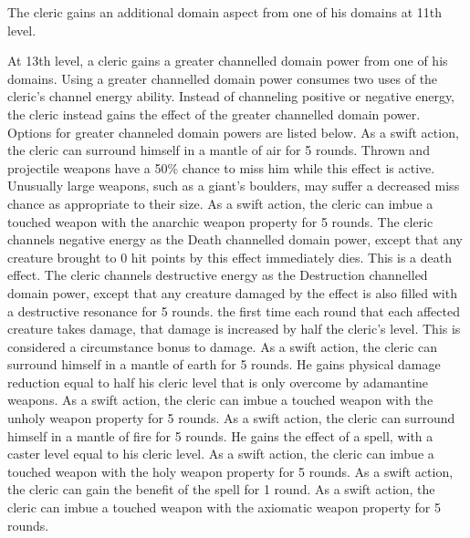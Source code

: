 \par The cleric gains an additional domain aspect from one of his domains at 11th level.

 At 13th level, a cleric gains a greater channelled domain power from one of his domains. Using a greater channelled domain power consumes two uses of the cleric's channel energy ability. Instead of channeling positive or negative energy, the cleric instead gains the effect of the greater channelled domain power. Options for greater channeled domain powers are listed below.
 As a swift action, the cleric can surround himself in a mantle of air for 5 rounds. Thrown and projectile weapons have a 50\% chance to miss him while this effect is active. Unusually large weapons, such as a giant's boulders, may suffer a decreased miss chance as appropriate to their size.
 As a swift action, the cleric can imbue a touched weapon with the anarchic weapon property for 5 rounds.
 The cleric channels negative energy as the Death channelled domain power, except that any creature brought to 0 hit points by this effect immediately dies. This is a death effect.
 The cleric channels destructive energy as the Destruction channelled domain power, except that any creature damaged by the effect is also filled with a destructive resonance for 5 rounds. the first time each round that each affected creature takes damage, that damage is increased by half the cleric's level. This is considered a circumstance bonus to damage.
 As a swift action, the cleric can surround himself in a mantle of earth for 5 rounds. He gains physical damage reduction equal to half his cleric level that is only overcome by adamantine weapons.
 As a swift action, the cleric can imbue a touched weapon with the unholy weapon property for 5 rounds.
 As a swift action, the cleric can surround himself in a mantle of fire for 5 rounds. He gains the effect of a  spell, with a caster level equal to his cleric level.
 As a swift action, the cleric can imbue a touched weapon with the holy weapon property for 5 rounds.
 As a swift action, the cleric can gain the benefit of the  spell for 1 round.
 As a swift action, the cleric can imbue a touched weapon with the axiomatic weapon property for 5 rounds.

